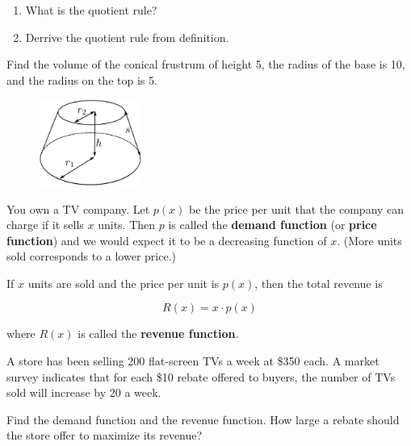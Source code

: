 \documentclass[12pt]{amsart}
\begin{document}
\newpage

\begin{problem}[20 points]
\begin{enumerate}
	\item What is the quotient rule?
	      \vspace{5cm}
	\item Derrive the quotient rule from definition.
\end{enumerate}
\end{problem}

\newpage

\begin{problem}[20 points]
Find the volume of the conical frustrum of height 5, the radius of the base is 10,
and the radius on the top is 5.
\begin{figure}[ht]
	\begin{center}
		\includegraphics[width=0.3\textwidth]{CroppedCone.svg.png}
	\end{center}
\end{figure}


\end{problem}

\newpage

\begin{problem}[20 points]
You own a TV company.
Let \( p(x) \) be the price per unit that the company can charge if it sells \( x \) units. Then \( p \) is called the \textbf{demand function} (or \textbf{price function}) and we would expect it to be a decreasing function of \( x \). (More units sold corresponds to a lower price.)

If \( x \) units are sold and the price per unit is \( p(x) \), then the total revenue is

\[
	R(x) = x \cdot p(x)
\]

where \( R(x) \) is called the \textbf{revenue function}.

A store has been selling 200 flat-screen TVs a week at \$350 each. A market survey indicates that for each \$10 rebate offered to buyers, the number of TVs sold will increase by 20 a week.

Find the demand function and the revenue function. How large a rebate should the store offer to maximize its revenue?

\end{problem}
\end{document}

